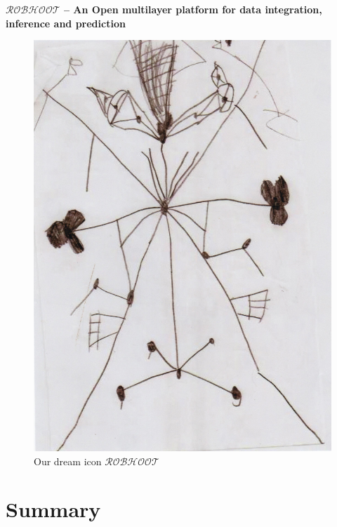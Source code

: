 \documentclass[english,12pt]{article}
\date{}
\begin{document}
\begin{flushleft}
\textbf{\Large {$\mathcal{ROBHOOT}$} -- An Open multilayer platform for data integration, inference and prediction}
\\
\begin{figure}
\vspace{-3 in}
\begin{center}
\includegraphics[scale=0.4]{robhoot.pdf}
\end{center}
\caption{Our dream icon $\mathcal{ROBHOOT}$}
\end{figure}
\end{flushleft}

\newpage


\tableofcontents
\newpage

\section{Summary}
\end{document}
